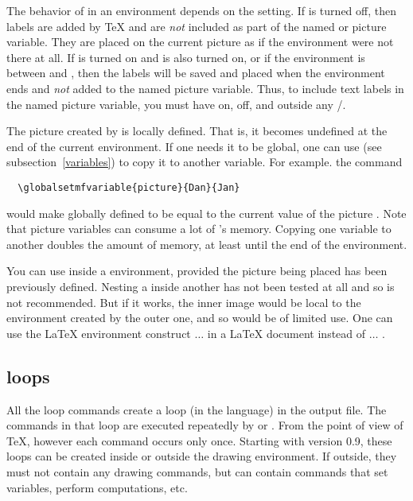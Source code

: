 \documentclass[letterpaper]{article}
\begin{document}
The behavior of  in an  environment depends on
the setting.  If  is turned off, then labels are added by
\TeX{} and are \emph{not} included as part of the named \MF{} or \MP{}
picture variable. They are placed on the current picture as if the
 environment were not there at all. If  is
turned on and  is also turned on, or if the
 environment is between  and
, then the labels will be saved and placed when the
 environment ends and \emph{not} added to the named picture
variable. Thus, to include text labels in the named picture variable,
you must have  on,  off, and
 outside any \slash{}.

The picture created by  is locally defined. That is, it
becomes undefined at the end of the current  environment. If
one needs it to be global, one can use  (see
subsection~\ref{variables}) to copy it to another variable. For example.
the command
\begin{verbatim}
  \globalsetmfvariable{picture}{Dan}{Jan}
\end{verbatim}
would make  globally defined to be equal to the current value
of the picture . Note that picture variables can consume a lot
of \MF{}'s memory. Copying one variable to another doubles the amount of
memory, at least until the end of the  environment.

You can use  inside a  environment,
provided the picture being placed has been previously defined. Nesting a
 inside another has not been tested at all and so is not
recommended. But if it works, the inner image would be local to the
environment created by the outer one, and so would be of limited use.
One can use the \LaTeX{} environment construct 
$\ldots$  in a LaTeX document instead of
 $\ldots$ .

\subsection{\CMF{} loops}\label{loops}

All the \mfp{} loop commands create a loop (in the \MF{} language) in
the output file. The \MF{} commands in that loop are executed repeatedly
by \MF{} or \MP{}. From the point of view of \TeX{}, however each
command occurs only once. Starting with version 0.9, these loops can be
created inside or outside the  drawing environment. If
outside, they must not contain any drawing commands, but can contain
commands that set variables, perform computations, etc.
\end{document}
